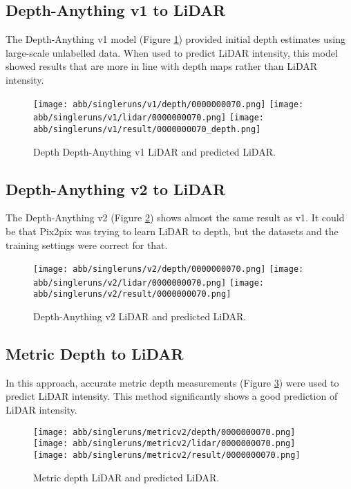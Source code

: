 \subsection{Depth-Anything v1 to LiDAR}

The Depth-Anything v1 model (Figure \ref{v1_results}) provided initial depth estimates using large-scale unlabelled data. When used to predict LiDAR intensity, this model showed results that are more in line with depth maps rather than LiDAR intensity.
\begin{figure}[!ht]
	\centering
	\texttt{[image: abb/singleruns/v1/depth/0000000070.png]}
	\texttt{[image: abb/singleruns/v1/lidar/0000000070.png]}
	\texttt{[image: abb/singleruns/v1/result/0000000070\_depth.png]}
	\caption{Depth Depth-Anything v1 LiDAR and predicted LiDAR.}
	\label{v1_results}
\end{figure}
\newpage
\subsection{Depth-Anything v2 to LiDAR}

The Depth-Anything v2 (Figure \ref{v2_results}) shows almost the same result as v1. It could be that Pix2pix was trying to learn LiDAR to depth, but the datasets and the training settings were correct for that.
\begin{figure}[!ht]
	\centering
	\texttt{[image: abb/singleruns/v2/depth/0000000070.png]}
	\texttt{[image: abb/singleruns/v2/lidar/0000000070.png]}
	\texttt{[image: abb/singleruns/v2/result/0000000070.png]}
	\caption{Depth-Anything v2 LiDAR and predicted LiDAR.}
	\label{v2_results}
\end{figure}
\newpage
\subsection{Metric Depth to LiDAR}
In this approach, accurate metric depth measurements (Figure \ref{metric_results}) were used to predict LiDAR intensity. This method significantly shows a good prediction of LiDAR intensity.
\begin{figure}[!ht]
	\centering
	\texttt{[image: abb/singleruns/metricv2/depth/0000000070.png]}
	\texttt{[image: abb/singleruns/metricv2/lidar/0000000070.png]}
	\texttt{[image: abb/singleruns/metricv2/result/0000000070.png]}
	\caption{Metric depth LiDAR and predicted LiDAR.}
	\label{metric_results}
\end{figure}
\newpage	
